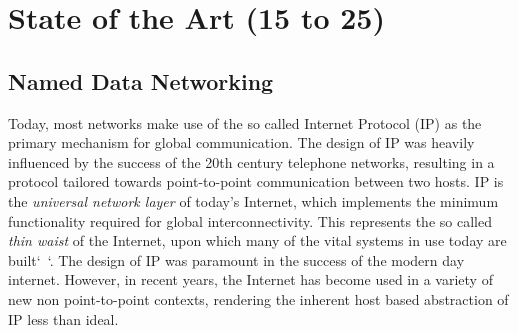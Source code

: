 \chapter{State of the Art (15 to 25)}



\section{Named Data Networking}
Today, most networks make use of the so called Internet Protocol (IP) as the primary mechanism for global communication. The design of IP was heavily influenced by the success of the 20th century telephone networks, resulting in a protocol tailored towards point-to-point communication between two hosts. IP is the \textit{universal network layer} of today's Internet, which implements the minimum functionality required for global interconnectivity. This represents the so called \textit{thin waist} of the Internet, upon which many of the vital systems in use today are built`~`\cite{ndn-exec-summary}. The design of IP was paramount in the success of the modern day internet. However, in recent years, the Internet has become used in a variety of new non point-to-point contexts, rendering the inherent host based abstraction of IP less than ideal.  

